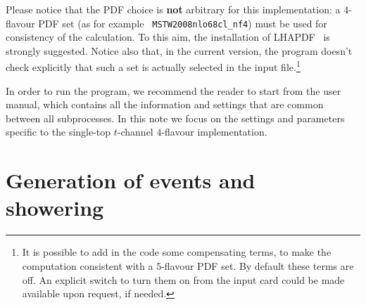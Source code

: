 \documentclass[paper]{JHEP3}
\newcommand{\tmtexttt}[1]{{\ttfamily{#1}}}
\begin{document}
Please notice that the PDF choice is \textbf{not} arbitrary for this
implementation: a $4$-flavour PDF set (as for example {\tt
  MSTW2008nlo68cl\_nf4}) must be used for consistency of the
calculation. To this aim, the installation of
LHAPDF~\cite{Whalley:2005nh} is strongly suggested. Notice also that,
in the current version, the program doesn't check explicitly that such
a set is actually selected in the input file.\footnote{It is possible
  to add in the code some compensating terms, to make the computation
  consistent with a $5$-flavour PDF set. By default these terms are
  off. An explicit switch to turn them on from the input card could be
  made available upon request, if needed.}

In order to run the \tmtexttt{POWHEG BOX} program, we recommend the
reader to start from the \tmtexttt{POWHEG BOX} user manual, which
contains all the information and settings that are common between all
subprocesses. In this note we focus on the settings and parameters
specific to the single-top $t$-channel $4$-flavour implementation.

\section{Generation of events and showering}
\end{document}
